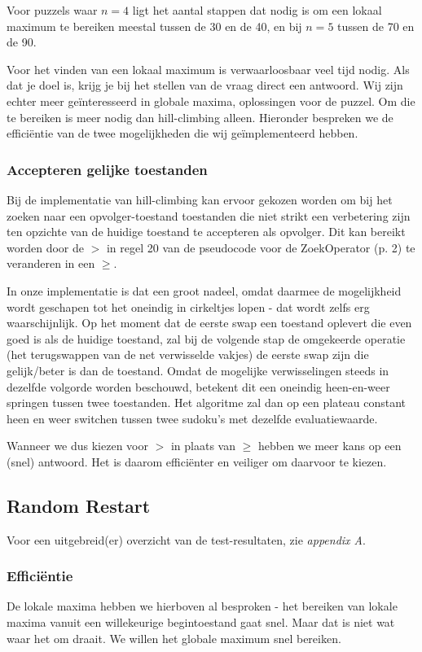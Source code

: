 \documentclass[]{report}
\begin{document}
Voor puzzels waar $n=4$ ligt het aantal stappen dat nodig is om een lokaal maximum te bereiken meestal tussen de 30 en de 40, en bij $n=5$ tussen de 70 en de 90.

Voor het vinden van een lokaal maximum is verwaarloosbaar veel tijd nodig. Als dat je doel is, krijg je bij het stellen van de vraag direct een antwoord. Wij zijn echter meer geïnteresseerd in globale maxima, oplossingen voor de puzzel. Om die te bereiken is meer nodig dan hill-climbing alleen. Hieronder bespreken we de effici\"{e}ntie van de twee mogelijkheden die wij ge\"{i}mplementeerd hebben.

\subsubsection{Accepteren gelijke toestanden}
Bij de implementatie van hill-climbing kan ervoor gekozen worden om bij het zoeken naar een opvolger-toestand toestanden die niet strikt een verbetering zijn ten opzichte van de huidige toestand te accepteren als opvolger. Dit kan bereikt worden door de $>$ in regel 20 van de pseudocode voor de ZoekOperator (p. 2) te veranderen in een $\geq$.

In onze implementatie is dat een groot nadeel, omdat daarmee de mogelijkheid wordt geschapen tot het oneindig in cirkeltjes lopen - dat wordt zelfs erg waarschijnlijk. Op het moment dat de eerste swap een toestand oplevert die even goed is als de huidige toestand, zal bij de volgende stap de omgekeerde operatie (het terugswappen van de net verwisselde vakjes) de eerste swap zijn die gelijk/beter is dan de toestand. Omdat de mogelijke verwisselingen steeds in dezelfde volgorde worden beschouwd, betekent dit een oneindig heen-en-weer springen tussen twee toestanden. Het algoritme zal dan op een plateau constant heen en weer switchen tussen twee sudoku's met dezelfde evaluatiewaarde.

Wanneer we dus kiezen voor $>$ in plaats van $\geq$ hebben we meer kans op een (snel) antwoord. Het is daarom effici\"{e}nter en veiliger om daarvoor te kiezen.

\subsection{Random Restart}
Voor een uitgebreid(er) overzicht van de test-resultaten, zie \textit{appendix A}.
\subsubsection{Effici\"{e}ntie}
De lokale maxima hebben we hierboven al besproken - het bereiken van lokale maxima vanuit een willekeurige begintoestand gaat snel. Maar dat is niet wat waar het om draait. We willen het globale maximum snel bereiken.
\end{document}
